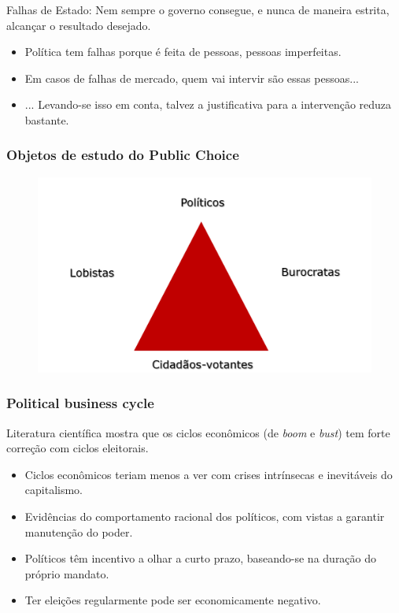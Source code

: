 \documentclass[a4paper,12pt]{article}[abntex2]
\begin{document}
Falhas de Estado: Nem sempre o governo consegue, e nunca de maneira estrita, alcançar o resultado desejado. \begin{itemize}
    \item Política tem falhas porque é feita de pessoas, pessoas imperfeitas. 
    \item Em casos de falhas de mercado, quem vai intervir são essas pessoas...
    \item ... Levando-se isso em conta, talvez a justificativa para a intervenção reduza bastante.
\end{itemize}

\subsubsection{\textbf{Objetos de estudo do Public Choice}}
\begin{figure}[H]
    \centering
    \includegraphics[width=0.7\linewidth]{Imagens/a15i5.png}
\end{figure}

\subsubsection{\textbf{Political business cycle}}
Literatura científica mostra que os ciclos econômicos (de \textit{boom} e \textit{bust}) tem forte correção com ciclos eleitorais.\begin{itemize}
    \item Ciclos econômicos teriam menos a ver com crises intrínsecas e inevitáveis do capitalismo. 
    \item Evidências do comportamento racional dos políticos, com vistas a garantir manutenção do poder. 
    \item Políticos têm incentivo a olhar a curto prazo, baseando-se na duração do próprio mandato.
    \item Ter eleições regularmente pode ser economicamente negativo. 
\end{itemize}
\end{document}
